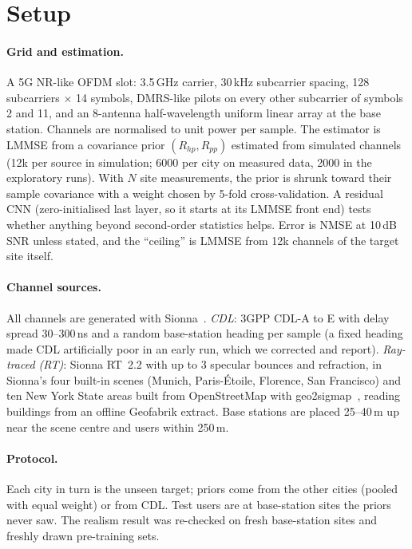 \documentclass[11pt]{article}
\begin{document}
\section{Setup}

\paragraph{Grid and estimation.} A 5G NR-like OFDM slot: 3.5\,GHz carrier,
30\,kHz subcarrier spacing, 128 subcarriers $\times$ 14 symbols, DMRS-like
pilots on every other subcarrier of symbols 2 and 11, and an 8-antenna
half-wavelength uniform linear array at the base station. Channels are
normalised to unit power per sample. The estimator is LMMSE from a covariance
prior $(R_{hp}, R_{pp})$ estimated from simulated channels (12k per source in
simulation; 6000 per city on measured data, 2000 in the exploratory runs). With $N$ site
measurements, the prior is shrunk toward their sample covariance with a weight
chosen by 5-fold cross-validation. A residual CNN (zero-initialised last layer,
so it starts at its LMMSE front end) tests whether anything beyond second-order
statistics helps. Error is NMSE at 10\,dB SNR unless stated, and the
``ceiling'' is LMMSE from 12k channels of the target site itself.

\paragraph{Channel sources.} All channels are generated with
Sionna~\cite{sionna}. \emph{CDL}: 3GPP CDL-A to E with delay spread
30--300\,ns and a random base-station heading per sample (a fixed heading made
CDL artificially poor in an early run, which we corrected and report).
\emph{Ray-traced (RT)}: Sionna RT~2.2 with up to 3 specular bounces and
refraction, in Sionna's four built-in scenes (Munich, Paris-\'Etoile, Florence,
San Francisco) and ten New York State areas built from OpenStreetMap with
geo2sigmap~\cite{geo2sigmap}, reading buildings from an offline Geofabrik
extract. Base stations are placed 25--40\,m up near the scene centre and users
within 250\,m.

\paragraph{Protocol.} Each city in turn is the unseen target; priors come from
the other cities (pooled with equal weight) or from CDL. Test users are at
base-station sites the priors never saw. The realism result was re-checked on
fresh base-station sites and freshly drawn pre-training sets.
\end{document}
